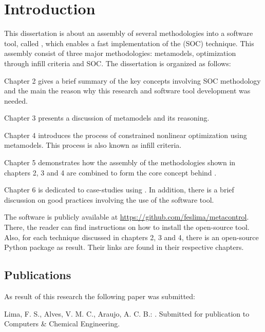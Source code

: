 \documentclass[../msc-thesis.tex]{subfiles}
\begin{document}
\chapter{Introduction}

This dissertation is about an assembly of several methodologies into a software 
tool, called \mtc, which enables a fast implementation of the \soc (SOC) 
technique. This assembly consist of three major methodologies: \kriging 
metamodels, optimization through infill criteria and SOC. The dissertation is 
organized as follows:

Chapter 2 gives a brief summary of the key concepts involving SOC methodology 
and the main the reason why this research and software tool development was 
needed.

Chapter 3 presents a discussion of \kriging metamodels and its reasoning.

Chapter 4 introduces the process of constrained nonlinear optimization using 
\kriging metamodels. This process is also known as infill criteria.

Chapter 5 demonstrates how the assembly of the methodologies shown in chapters 
2, 3 and 4 are combined to form the core concept behind \mtc.

Chapter 6 is dedicated to case-studies using \mtc. In addition, there is a 
brief discussion on good practices involving the use of the software tool.

The \mtc software is publicly available at 
\url{https://github.com/feslima/metacontrol}. There, the reader can find 
instructions on how to install the open-source tool. Also, for each technique 
discussed in chapters 2, 3 and 4, there is an open-source Python package as 
result. Their links are found in their respective chapters.

\section{Publications}

As result of this research the following paper was submitted:

Lima, F. S., Alves, V. M. C., Araujo, A. C. B.: \imprimirtitulo. Submitted 
for publication to Computers \& Chemical Engineering.
\end{document}
